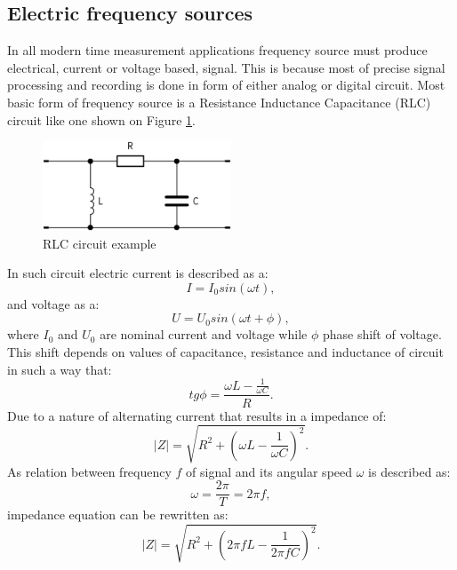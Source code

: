 \subsection{Electric frequency sources}
\label{sec:electronic_frequency}
\FloatBarrier
In all modern time measurement applications frequency source must produce electrical, current or
voltage based, signal. This is because most of precise signal processing and recording is done
in form of either analog or digital circuit.
Most basic form of frequency source is a Resistance Inductance Capacitance (RLC) circuit like 
one shown on Figure \ref{fig:rlc_circ}.
\begin{figure}[htb] 
	\label{fig:rlc_circ}
	\centering
	\includegraphics[width=0.5\textwidth]{figures/rlc}
	\caption{RLC circuit example}
\end{figure}
In such circuit electric current is described as a:
\begin{equation}
	\label{equ:rlc_current}
	I = I_{0}sin(\omega t),
\end{equation}
and voltage as a:
\begin{equation}
	\label{equ:rlc_voltage}
	U = U_{0}sin(\omega t + \phi),
\end{equation}
where $I_{0}$ and $U_{0}$ are nominal current and voltage while $\phi$ phase shift of voltage.
This shift depends on values of capacitance, resistance and inductance of circuit in such a way
that:
\begin{equation}
	\label{equ:rlc_freq}
	tg\phi = \frac{\omega L - \frac{1}{\omega C} }{R}.
\end{equation}
Due to a nature of alternating current that results in a impedance of:
\begin{equation}
	\label{equ:rlc_impedance}
	|Z| = \sqrt{R^{2}+ (\omega L - \frac{1}{\omega C})^{2} }.
\end{equation}
As relation between frequency $f$ of signal and its angular speed $\omega$ is described as:
\begin{equation}
	\label{equ:pulse_to_freq}
	\omega = \frac{2\pi}{T} = 2\pi f,
\end{equation}
impedance equation can be rewritten as:
\begin{equation}
	\label{equ:rlc_impedance}
	|Z| = \sqrt{R^{2}+ (2\pi fL - \frac{1}{2\pi f C})^{2} }.
\end{equation}
